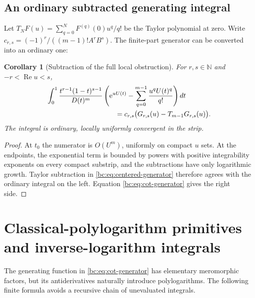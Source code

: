 \documentclass[11pt,letterpaper]{article}
\numberwithin{equation}{section}
\newtheorem{corollary}[theorem]{Corollary}
\theoremstyle{definition}
\theoremstyle{remark}
\newcommand{\bcRe}{\operatorname{Re}}
\newcommand{\bcN}{\mathbb N}
\newcommand{\bce}{\mathrm e}
\begin{document}
\subsection{An ordinary subtracted generating integral}

Let $T_NF(u)=\sum_{q=0}^NF^{(q)}(0)u^q/q!$ be the Taylor polynomial
at zero. Write $c_{r,s}=(-1)^r/((m-1)!A^rB^s)$. The finite-part generator
can be converted into an ordinary one:
\begin{corollary}[Subtraction of the full local obstruction]
\label{bc:cor:ordinary-generator}
For $r,s\in\bcN$ and $-r<\bcRe u<s$,
\begin{align}
 &\int_0^1\frac{t^{r-1}(1-t)^{s-1}}{D(t)^m}
     \left(\bce^{uU(t)}-\sum_{q=0}^{m-1}
                        \frac{u^qU(t)^q}{q!}\right)dt\notag\\
 &\hspace{35mm}=c_{r,s}\bigl(G_{r,s}(u)-T_{m-1}G_{r,s}(u)\bigr).
 \label{bc:eq:ordinary-generator}
\end{align}
The integral is ordinary, locally uniformly convergent in the strip.
\end{corollary}
\begin{proof}
At $t_0$ the numerator is $O(U^m)$, uniformly on compact $u$ sets.
At the endpoints, the exponential term is bounded by powers with
positive integrability exponents on every compact substrip, and the
subtractions have only logarithmic growth. Taylor subtraction in
\eqref{bc:eq:centered-generator} therefore agrees with the ordinary
integral on the left. Equation \eqref{bc:eq:cot-generator} gives the
right side.
\end{proof}

\section{Classical-polylogarithm primitives and inverse-logarithm integrals}
\label{bc:sec:polylog}

The generating function in \eqref{bc:eq:cot-generator} has elementary
meromorphic factors, but its antiderivatives naturally introduce
polylogarithms. The following finite formula avoids a recursive chain of
unevaluated integrals.
\end{document}
